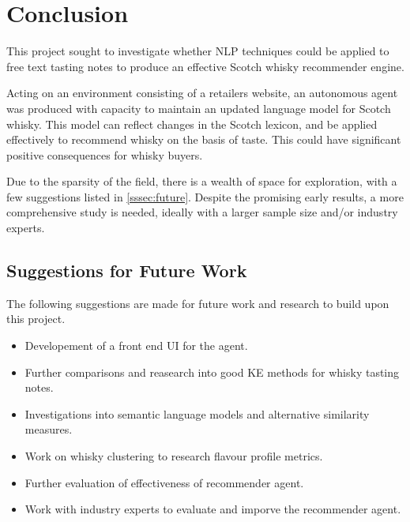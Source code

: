 \section{Conclusion}\label{sec:conc}
This project sought to investigate whether NLP techniques could be applied to free text tasting notes 
to produce an effective Scotch whisky recommender engine.

Acting on an environment consisting of a retailers website, an autonomous
agent was produced with capacity to maintain an updated language model for Scotch whisky. This model
can reflect changes in the Scotch lexicon, and be applied effectively to recommend whisky on the basis of
taste. This could have significant positive consequences for whisky buyers.

Due to the sparsity of the field, there is a wealth of space for exploration, with a few suggestions listed
in \autoref{sssec:future}.  Despite the promising early results, a more comprehensive study is needed, ideally
with a larger sample size and/or industry experts.

\subsection{Suggestions for Future Work}\label{sssec:future}

The following suggestions are made for future work and research to build upon this project.

\begin{itemize}
    \item Developement of a front end UI for the agent.
    \item Further comparisons and reasearch into good KE methods for whisky tasting notes.
    \item Investigations into semantic language models and alternative similarity measures.
    \item Work on whisky clustering to research flavour profile metrics.
    \item Further evaluation of effectiveness of recommender agent.
    \item Work with industry experts to evaluate and imporve the recommender agent.
\end{itemize}